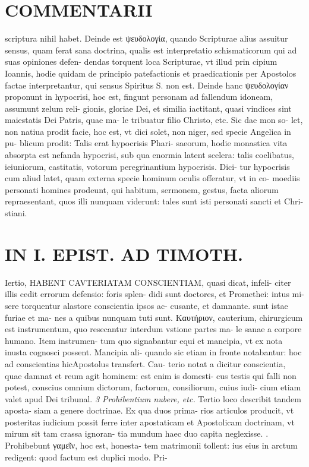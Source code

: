 \documentclass{article}
\begin{document}
\begin{pages}
\section*{COMMENTARII }
\marginpar{[ p.88 ]}\pstart scriptura nihil habet. Deinde est ψευδολογία, quando Scripturae alius assuitur sensus, quam ferat sana doctrina, qualis est interpretatio schismaticorum qui ad suas opiniones defen- dendas torquent loca Scripturae, vt illud prin cipium Ioannis, hodie quidam de principio patefactionis et praedicationis per Apostolos factae interpretantur, qui sensus Spiritus S. non est. Deinde hanc ψευδολογίαν proponunt in hypocrisi, hoc est, fingunt personam ad fallendum idoneam, assumunt zelum reli- gionis, gloriae Dei, et similia iactitant, quasi vindices sint maiestatis Dei Patris, quae ma- le tribuatur filio Christo, etc. Sic dae mon so- let, non natiua prodit facie, hoc est, vt dici solet, non niger, sed specie Angelica in pu- blicum prodit: Talis erat hypocrisis Phari- saeorum, hodie monastica vita absorpta est nefanda hypocrisi, sub qua enormia latent scelera: talis coelibatus, ieiuniorum, castitatis, votorum peregrinantium hypocrisis. Dici- tur hypocrisis cum aliud latet, quam externa specie hominum oculis offeratur, vt in co- moediis personati homines prodeunt, qui habitum, sermonem, gestus, facta aliorum repraesentant, quos illi nunquam viderunt: tales sunt isti personati sancti et Chri- stiani.  \pend
\section*{IN I. EPIST. AD TIMOTH. }
\marginpar{[ p.89 ]}\pstart Iertio, HABENT CAVTERIATAM CONSCIENTIAM, quasi dicat, infeli- citer illis cedit errorum defensio: foris splen- didi sunt doctores, et Promethei: intus mi- sere torquentur alastore conscientia ipsos ac- cusante, et damnante. sunt istae furiae et ma- nes a quibus nunquam tuti sunt. Καυτήριον, cauterium, chirurgicum est instrumentum, quo resecantur interdum vstione partes ma- le sanae a corpore humano. Item instrumen- tum quo signabantur equi et mancipia, vt ex nota inusta cognosci possent. Mancipia ali- quando sic etiam in fronte notabantur: hoc ad conscientias hicApostolus transfert. Cau- terio notat a dicitur conscientia, quae damnat et reum agit hominem: est enim is domesti- cus testis qui falli non potest, conscius omnium dictorum, factorum, consiliorum, cuius iudi- cium etiam valet apud Dei tribunal.  \pend
\textit{3 Prohibentium nubere, etc. }\pstart Tertio loco describit tandem aposta- siam a genere doctrinae. Ex qua duos prima- rios articulos producit, vt posteritas iudicium possit ferre inter apostaticam et Apostolicam doctrinam, vt mirum sit tam crassa ignoran- tia mundum haec duo capita neglexisse.  \pend{}. Prohibebunt γαμεῖν, hoc est, honesta- tem matrimonii tollent: ius eius in arctum redigent: quod factum est duplici modo. Pri-  \pend

\end{pages}
\end{document}
